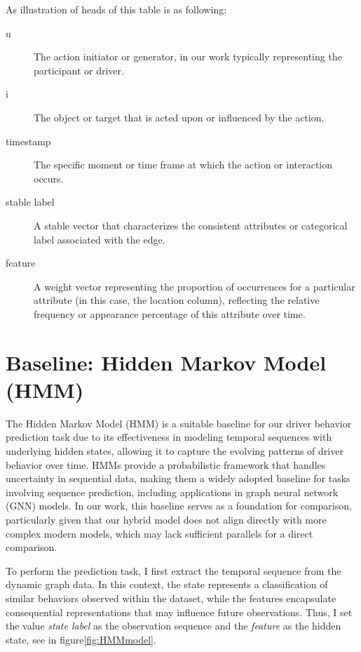 As illustration of heads of this table is as following:

\begin{description}
    \item[u] The action initiator or generator, in our work typically representing the participant or driver.
    \item[i] The object or target that is acted upon or influenced by the action.
    \item[timestamp] The specific moment or time frame at which the action or interaction occurs.
    \item[stable label] A stable vector that characterizes the consistent attributes or categorical label associated with the edge.
    \item[feature] A weight vector representing the proportion of occurrences for a particular attribute (in this case, the location column), reflecting the relative frequency or appearance percentage of this attribute over time.
\end{description}



\section{Baseline: Hidden Markov Model (HMM)}


The Hidden Markov Model (HMM) is a suitable baseline for our driver behavior prediction task due to its effectiveness in modeling temporal sequences with underlying hidden states, allowing it to capture the evolving patterns of driver behavior over time. HMMs provide a probabilistic framework that handles uncertainty in sequential data, making them a widely adopted baseline for tasks involving sequence prediction, including applications in graph neural network (GNN) models. In our work, this baseline serves as a foundation for comparison, particularly given that our hybrid model does not align directly with more complex modern models, which may lack sufficient parallels for a direct comparison.

To perform the prediction task, I first extract the temporal sequence from the dynamic graph data. In this context, the state represents a classification of similar behaviors observed within the dataset, while the features encapsulate consequential representations that may influence future observations. Thus, I set the value \textit{state label} as the observation sequence and the \textit{feature} as the hidden state, see in figure\ref{fig:HMMmodel}.

